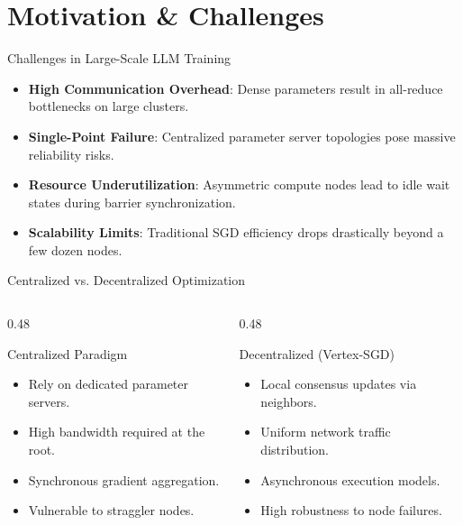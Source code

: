\section{Motivation \& Challenges}

\begin{frame}{Challenges in Large-Scale LLM Training}
    \begin{itemize}[<+->]
        \item \textbf{High Communication Overhead}: Dense parameters result in all-reduce bottlenecks on large clusters.
        \item \textbf{Single-Point Failure}: Centralized parameter server topologies pose massive reliability risks.
        \item \textbf{Resource Underutilization}: Asymmetric compute nodes lead to idle wait states during barrier synchronization.
        \item \textbf{Scalability Limits}: Traditional SGD efficiency drops drastically beyond a few dozen nodes.
    \end{itemize}
\end{frame}

\begin{frame}{Centralized vs. Decentralized Optimization}
    \begin{columns}[T]
        \begin{column}{0.48\textwidth}
            \begin{block}{Centralized Paradigm}
                \begin{itemize}
                    \item Rely on dedicated parameter servers.
                    \item High bandwidth required at the root.
                    \item Synchronous gradient aggregation.
                    \item Vulnerable to straggler nodes.
                \end{itemize}
            \end{block}
        \end{column}
        \hfill
        \begin{column}{0.48\textwidth}
            \begin{block}{Decentralized (Vertex-SGD)}
                \begin{itemize}
                    \item Local consensus updates via neighbors.
                    \item Uniform network traffic distribution.
                    \item Asynchronous execution models.
                    \item High robustness to node failures.
                \end{itemize}
            \end{block}
        \end{column}
    \end{columns}
\end{frame}
